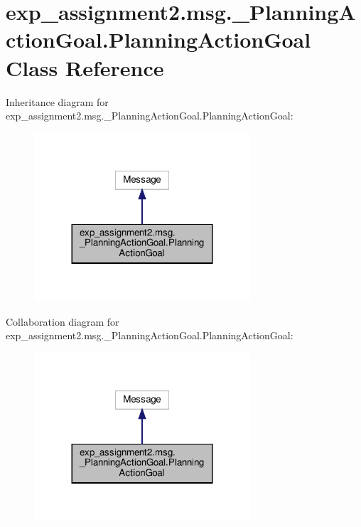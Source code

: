 \hypertarget{classexp__assignment2_1_1msg_1_1__PlanningActionGoal_1_1PlanningActionGoal}{}\section{exp\+\_\+assignment2.\+msg.\+\_\+\+Planning\+Action\+Goal.\+Planning\+Action\+Goal Class Reference}
\label{classexp__assignment2_1_1msg_1_1__PlanningActionGoal_1_1PlanningActionGoal}


Inheritance diagram for exp\+\_\+assignment2.\+msg.\+\_\+\+Planning\+Action\+Goal.\+Planning\+Action\+Goal\+:
\nopagebreak
\begin{figure}[H]
\begin{center}
\leavevmode
\includegraphics[width=228pt]{classexp__assignment2_1_1msg_1_1__PlanningActionGoal_1_1PlanningActionGoal__inherit__graph}
\end{center}
\end{figure}


Collaboration diagram for exp\+\_\+assignment2.\+msg.\+\_\+\+Planning\+Action\+Goal.\+Planning\+Action\+Goal\+:
\nopagebreak
\begin{figure}[H]
\begin{center}
\leavevmode
\includegraphics[width=228pt]{classexp__assignment2_1_1msg_1_1__PlanningActionGoal_1_1PlanningActionGoal__coll__graph}
\end{center}
\end{figure}
